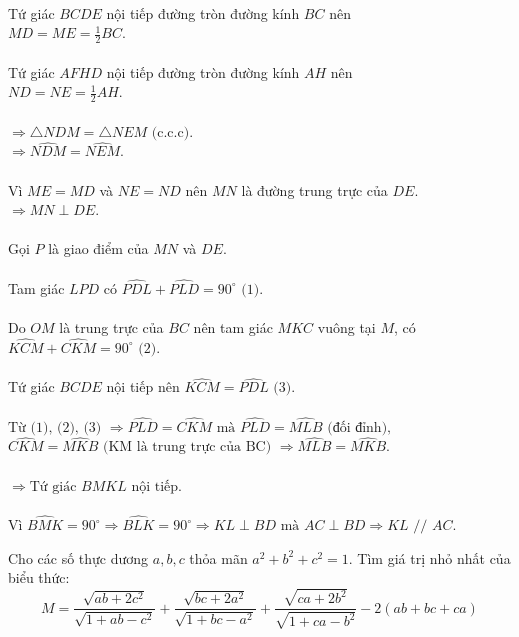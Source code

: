 \begin{ex}
{	\\
	Tứ giác $BCDE$ nội tiếp đường tròn đường kính $BC$ nên \\
	$MD = ME = \frac{1}{2} BC$. \\
	\\
	Tứ giác $AFHD$ nội tiếp đường tròn đường kính $AH$ nên \\
	$ND = NE = \frac{1}{2} AH$. \\
	\\
	$\Rightarrow \triangle NDM = \triangle NEM \text{ (c.c.c)}$. \\
	$\Rightarrow \widehat{NDM} = \widehat{NEM}$. \\
	\\
	Vì $ME = MD$ và $NE = ND$ nên $MN$ là đường trung trực của $DE$. \\
	$\Rightarrow MN \perp DE$. \\
	\\
	Gọi $P$ là giao điểm của $MN$ và $DE$. \\
	\\
	Tam giác $LPD$ có $\widehat{PDL} + \widehat{PLD} = 90^\circ \text{ (1)}$. \\
	\\
	Do $OM$ là trung trực của $BC$ nên tam giác $MKC$ vuông tại $M$, có \\
	$\widehat{KCM} + \widehat{CKM} = 90^\circ \text{ (2)}$. \\
	\\
	Tứ giác $BCDE$ nội tiếp nên $\widehat{KCM} = \widehat{PDL} \text{ (3)}$. \\
	\\
	$\text{Từ (1), (2), (3) } \Rightarrow \widehat{PLD} = \widehat{CKM} \text{ mà } \widehat{PLD} = \widehat{MLB} \text{ (đối đỉnh)},$ \\
	$\widehat{CKM} = \widehat{MKB} \text{ (KM là trung trực của BC) } \Rightarrow \widehat{MLB} = \widehat{MKB}$. \\
	\\
	$\Rightarrow \text{Tứ giác } BMKL \text{ nội tiếp.}$ \\
	\\
	$\text{Vì } \widehat{BMK} = 90^\circ \Rightarrow \widehat{BLK} = 90^\circ \Rightarrow KL \perp BD \text{ mà } AC \perp BD \Rightarrow KL \text{ // } AC.$
}

\end{ex}


\begin{ex} %
	Cho các số thực dương $a,b,c$ thỏa mãn $a^2+b^2+c^2=1$.
	Tìm giá trị nhỏ nhất của biểu thức:
	$$ M = \frac{\sqrt{ab+2c^2}}{\sqrt{1+ab-c^2}} + \frac{\sqrt{bc+2a^2}}{\sqrt{1+bc-a^2}} + \frac{\sqrt{ca+2b^2}}{\sqrt{1+ca-b^2}} - 2(ab+bc+ca) $$
\end{ex}

